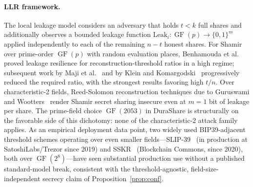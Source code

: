 \documentclass[11pt]{article}
\newcommand{\GF}{\operatorname{GF}}
\begin{document}
\paragraph{LLR framework.} The local leakage model considers an adversary that holds $t < k$ full shares and additionally observes a bounded leakage function $\mathrm{Leak}_i : \GF(p) \to \{0,1\}^m$ applied independently to each of the remaining $n - t$ honest shares. For Shamir over prime-order $\GF(p)$ with random evaluation places, Benhamouda et al.~\cite{benhamouda2018} proved leakage resilience for reconstruction-threshold ratios in a high regime; subsequent work by Maji et al.~\cite{maji2021,maji2025} and by Klein and Komargodski~\cite{klein2023} progressively reduced the required ratio, with the strongest results favoring high $t/n$. Over characteristic-2 fields, Reed-Solomon reconstruction techniques due to Guruswami and Wootters~\cite{guruswamiwootters2016} render Shamir secret sharing insecure even at $m = 1$ bit of leakage per share. The prime-field choice $\GF(2053)$ in DuraShare is structurally on the favorable side of this dichotomy: none of the characteristic-2 attack family applies. As an empirical deployment data point, two widely used BIP39-adjacent threshold schemes operating over even smaller fields---SLIP-39~\cite{slip39} (in production at SatoshiLabs/Trezor since 2019) and SSKR~\cite{sskr} (Blockchain Commons, since 2020), both over $\GF(2^8)$---have seen substantial production use without a published standard-model break, consistent with the threshold-agnostic, field-size-independent secrecy claim of Proposition~\ref{prop:conf}.
\end{document}
